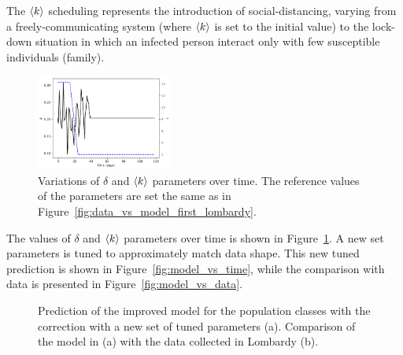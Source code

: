 The $\braket{k}$ scheduling represents the introduction of social-distancing, varying from a freely-communicating system (where  $\braket{k}$ is set to the initial value) to the lock-down situation in which an infected person interact only with few susceptible individuals (family).\\

\begin{figure}
\centering
\includegraphics[width=0.4\textwidth]{imgs/Covid/Scheduling_regular.pdf} 
  \caption{Variations of $\delta$ and $\braket{k}$ parameters over time. The reference values of the parameters are set the same as in Figure~\ref{fig:data_vs_model_first_lombardy}.}
  \label{fig:scheduling}
\end{figure}

The values of $\delta$ and $\braket{k}$ parameters over time is shown in Figure~\ref{fig:scheduling}. A new set parameters is tuned to approximately match data shape. This new tuned prediction is shown in Figure~\ref{fig:model_vs_time}, while the comparison with data is presented in Figure~\ref{fig:model_vs_data}.\\

\begin{figure}
\centering
{}
  \caption{Prediction of the improved model for the population classes with the correction with a new set of tuned parameters (a). Comparison of the model in (a) with the data collected in Lombardy (b).}
  
\end{figure}



